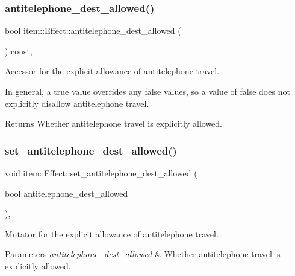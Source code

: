 \subsubsection{\texorpdfstring{antitelephone\+\_\+dest\+\_\+allowed()}{antitelephone\_dest\_allowed()}}
{\footnotesize\ttfamily bool item\+::\+Effect\+::antitelephone\+\_\+dest\+\_\+allowed (\begin{DoxyParamCaption}{ }\end{DoxyParamCaption}) const\hspace{0.3cm}{\ttfamily [inline]}, {\ttfamily [noexcept]}}



Accessor for the explicit allowance of antitelephone travel. 

In general, a {\ttfamily true} value overrides any {\ttfamily false} values, so a value of {\ttfamily false} does not explicitly disallow antitelephone travel. \begin{DoxyReturn}{Returns}
Whether antitelephone travel is explicitly allowed. 
\end{DoxyReturn}
\mbox{\label{classitem_1_1_effect_add9197b674f7ebd90c6a412d4a65e0e1}} 
\subsubsection{\texorpdfstring{set\+\_\+antitelephone\+\_\+dest\+\_\+allowed()}{set\_antitelephone\_dest\_allowed()}}
{\footnotesize\ttfamily void item\+::\+Effect\+::set\+\_\+antitelephone\+\_\+dest\+\_\+allowed (\begin{DoxyParamCaption}\item[{bool}]{antitelephone\+\_\+dest\+\_\+allowed }\end{DoxyParamCaption})\hspace{0.3cm}{\ttfamily [inline]}, {\ttfamily [noexcept]}}



Mutator for the explicit allowance of antitelephone travel. 


\begin{DoxyParams}{Parameters}
{\em antitelephone\+\_\+dest\+\_\+allowed} & Whether antitelephone travel is explicitly allowed. \\
\hline
\end{DoxyParams}
\mbox{\label{classitem_1_1_effect_a05de623b49c24c11fdb765c61c0367d0}} 
